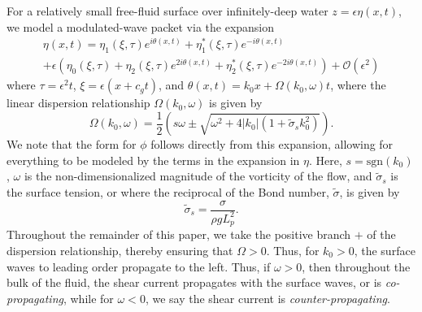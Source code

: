 \documentclass[a4paper,11pt]{article}
\begin{document}
For a relatively small free-fluid surface over infinitely-deep water $z=\epsilon \eta(x,t)$, we model a modulated-wave packet via the expansion 
\begin{multline*}
\eta(x,t) = \eta_{1}(\xi,\tau)e^{i\theta(x,t)} + \eta^{\ast}_{1}(\xi,\tau)e^{-i\theta(x,t)}\\
+ \epsilon\left(\eta_{0}(\xi,\tau) + \eta_{2}(\xi,\tau)e^{2i\theta(x,t)} + \eta^{\ast}_{2}(\xi,\tau)e^{-2i\theta(x,t)}\right) + \mathcal{O}\left(\epsilon^{2} \right)
\end{multline*}
where $\tau = \epsilon^{2}t$, $\xi = \epsilon(x+c_{g}t)$, and $\theta(x,t) = k_{0}x + \Omega(k_{0},\omega)t$, where the linear dispersion relationship $\Omega(k_{0},\omega)$ is given by
\[
\Omega(k_{0},\omega) = \frac{1}{2}\left(s\omega \pm \sqrt{\omega^{2} + 4|k_{0}|\left(1+\tilde{\sigma}_{s}k_{0}^{2}\right)} \right).
\]
We note that the form for $\phi$ follows directly from this expansion, allowing for everything to be modeled by the terms in the expansion in $\eta$.  Here, $s = \mbox{sgn}(k_{0})$, $\omega$ is the non-dimensionalized magnitude of the vorticity of the flow, and $\tilde{\sigma}_{s}$ is the surface tension, or where the reciprocal of the Bond number, $\tilde{\sigma}$, is given by
\[
\tilde{\sigma}_{s} = \frac{\sigma}{\rho g L_{p}^2}.
\]
Throughout the remainder of this paper, we take the positive branch $+$ of the dispersion relationship, thereby ensuring that $\Omega > 0$.  Thus, for $k_{0}>0$, the surface waves to leading order propagate to the left.  Thus, if $\omega>0$, then throughout the bulk of the fluid, the shear current propagates with the surface waves, or is {\it co-propagating}, while for $\omega<0$, we say the shear current is {\it counter-propagating}.  
\end{document}
